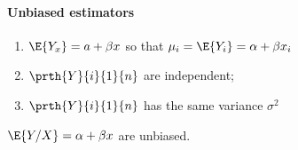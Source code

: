 \paragraph{Unbiased estimators}
\begin{enumerate}
	\item $\E{Y_{x}}=a+\beta x$ so that $\mu_{i}=\E{Y_{i}}=\alpha+
		\beta x_{i}$
	\item $\prth{Y}{i}{1}{n}$ are independent;
	\item $\prth{Y}{i}{1}{n}$ has the same variance $\sigma^{2}$
\end{enumerate}
$\E{Y/X}=\alpha + \beta x$ are unbiased.

